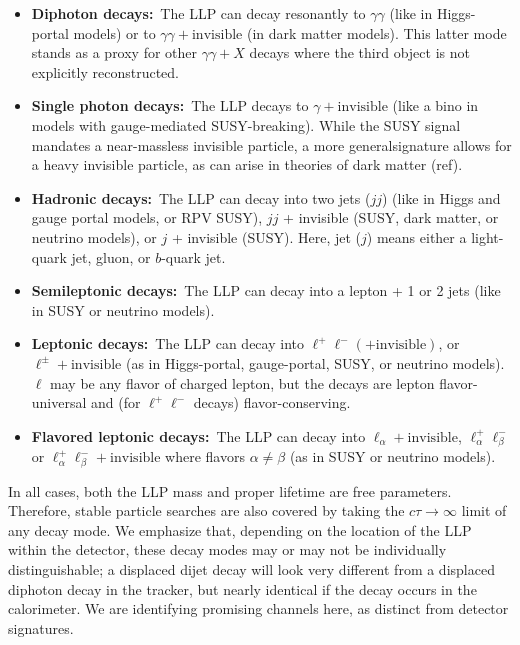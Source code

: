
\begin{itemize}
\item {\bf Diphoton decays:}~The LLP can decay resonantly to
  $\gamma\gamma$ (like in Higgs-portal models) or to
  $\gamma\gamma+\mathrm{invisible}$ (in dark matter models). This
  latter mode stands as a proxy for other $\gamma\gamma+X$ decays
  where the third object is not explicitly reconstructed.

\item {\bf Single photon decays:}~The LLP decays to
  $\gamma+\mathrm{invisible}$ (like a bino in models with
  gauge-mediated SUSY-breaking).  While the SUSY signal mandates a
  near-massless invisible particle, a more generalsignature allows for
  a heavy invisible particle, as can arise in theories of dark matter
  (ref).

\item {\bf Hadronic decays:}~The LLP can decay into two jets ($jj$)
  (like in Higgs and gauge portal models, or RPV SUSY), $jj$ +
  invisible (SUSY, dark matter, or neutrino models), or $j$ +
  invisible (SUSY). Here, jet ($j$) means either a light-quark jet,
  gluon, or $b$-quark jet.

\item {\bf Semileptonic decays:}~The LLP can decay into a lepton + 1
  or 2 jets (like in SUSY or neutrino models).

\item {\bf Leptonic decays:}~The LLP can decay into
  $\ell^+\ell^-(+\mathrm{invisible})$, or
  $\ell^\pm+\mathrm{invisible}$ (as in Higgs-portal, gauge-portal,
  SUSY, or neutrino models). $\ell$ may be any flavor of charged
  lepton, but the decays are lepton flavor-universal and (for
  $\ell^+\ell^-$ decays) flavor-conserving.

\item {\bf Flavored leptonic decays:}~The LLP can decay into
  $\ell_\alpha+\mathrm{invisible}$, $\ell_\alpha^+\ell_\beta^-$ or
  $\ell_\alpha^+\ell_\beta^-+\mathrm{invisible}$ where flavors
  $\alpha\neq\beta$ (as in SUSY or neutrino models).
\end{itemize}

In all cases, both the LLP mass and proper lifetime are free
parameters.  Therefore, stable particle searches are also covered by
taking the $c\tau\rightarrow\infty$ limit of any decay mode.  We
emphasize that, depending on the location of the LLP within the
detector, these decay modes may or may not be individually
distinguishable; a displaced dijet decay will look very different from
a displaced diphoton decay in the tracker, but nearly identical if the
decay occurs in the calorimeter.  We are identifying promising
channels here, as distinct from detector signatures. 

